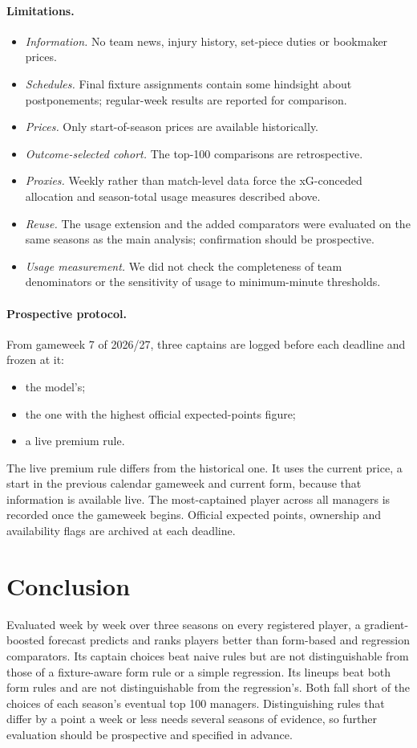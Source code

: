 \documentclass[11pt,a4paper]{article}
\begin{document}
\paragraph{Limitations.}
\begin{itemize}
  \item \emph{Information.} No team news, injury history, set-piece duties or bookmaker prices.
  \item \emph{Schedules.} Final fixture assignments contain some hindsight about postponements;
        regular-week results are reported for comparison.
  \item \emph{Prices.} Only start-of-season prices are available historically.
  \item \emph{Outcome-selected cohort.} The top-100 comparisons are retrospective.
  \item \emph{Proxies.} Weekly rather than match-level data force the xG-conceded allocation and
        season-total usage measures described above.
  \item \emph{Reuse.} The usage extension and the added comparators were evaluated on the same
        seasons as the main analysis; confirmation should be prospective.
  \item \emph{Usage measurement.} We did not check the completeness of team denominators or the
        sensitivity of usage to minimum-minute thresholds.
\end{itemize}

\paragraph{Prospective protocol.} From gameweek 7 of 2026/27, three captains are logged before each
deadline and frozen at it:
\begin{itemize}
  \item the model's;
  \item the one with the highest official expected-points figure;
  \item a live premium rule.
\end{itemize}
The live premium rule differs from the historical one. It uses the current price, a start in the
previous calendar gameweek and current form, because that information is available live. The
most-captained player across all managers is recorded once the gameweek begins. Official expected
points, ownership and availability flags are archived at each deadline.

\section{Conclusion}
Evaluated week by week over three seasons on every registered player, a gradient-boosted forecast
predicts and ranks players better than form-based and regression comparators. Its captain choices
beat naive rules but are not distinguishable from those of a fixture-aware form rule or a simple
regression. Its lineups beat both form rules and are not distinguishable from the regression's.
Both fall short of the choices of each season's eventual top 100 managers.
Distinguishing rules that differ by a point a week or less needs several seasons of evidence, so
further evaluation should be prospective and specified in advance.
\end{document}
